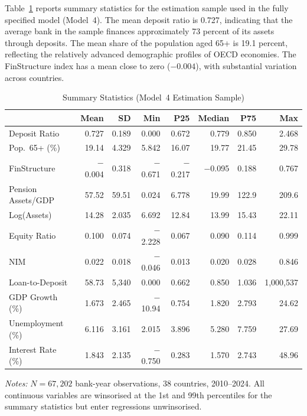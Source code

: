 \documentclass[12pt,a4paper]{article}
\begin{document}
Table~\ref{tab:sumstats} reports summary statistics for the estimation sample used in the fully specified model (Model~4). The mean deposit ratio is 0.727, indicating that the average bank in the sample finances approximately 73 percent of its assets through deposits. The mean share of the population aged 65+ is 19.1 percent, reflecting the relatively advanced demographic profiles of OECD economies. The FinStructure index has a mean close to zero ($-0.004$), with substantial variation across countries.

\begin{table}[H]
\centering
\caption{Summary Statistics (Model~4 Estimation Sample)}
\label{tab:sumstats}
\small
\begin{threeparttable}
\begin{tabular}{l r r r r r r r}
\toprule
& \textbf{Mean} & \textbf{SD} & \textbf{Min} & \textbf{P25} & \textbf{Median} & \textbf{P75} & \textbf{Max} \\
\midrule
Deposit Ratio       & 0.727 & 0.189 & 0.000 & 0.672 & 0.779 & 0.850 & 2.468 \\
Pop.\ 65+ (\%)     & 19.14 & 4.329 & 5.842 & 16.07 & 19.77 & 21.45 & 29.78 \\
FinStructure        & $-$0.004 & 0.318 & $-$0.671 & $-$0.217 & $-$0.095 & 0.188 & 0.767 \\
Pension Assets/GDP  & 57.52 & 59.51 & 0.024 & 6.778 & 19.99 & 122.9 & 209.6 \\
Log(Assets)         & 14.28 & 2.035 & 6.692 & 12.84 & 13.99 & 15.43 & 22.11 \\
Equity Ratio        & 0.100 & 0.074 & $-$2.228 & 0.067 & 0.090 & 0.114 & 0.999 \\
NIM                 & 0.022 & 0.018 & $-$0.046 & 0.013 & 0.020 & 0.028 & 0.846 \\
Loan-to-Deposit     & 58.73 & 5,340 & 0.000 & 0.662 & 0.850 & 1.036 & 1,000,537 \\
GDP Growth (\%)     & 1.673 & 2.465 & $-$10.94 & 0.754 & 1.820 & 2.793 & 24.62 \\
Unemployment (\%)   & 6.116 & 3.161 & 2.015 & 3.896 & 5.280 & 7.759 & 27.69 \\
Interest Rate (\%)  & 1.843 & 2.135 & $-$0.750 & 0.283 & 1.570 & 2.743 & 48.96 \\
\bottomrule
\end{tabular}
\begin{tablenotes}
\small
\item \textit{Notes:} $N = 67{,}202$ bank-year observations, 38 countries, 2010--2024. All continuous variables are winsorised at the 1st and 99th percentiles for the summary statistics but enter regressions unwinsorised.
\end{tablenotes}
\end{threeparttable}
\end{table}
\end{document}

